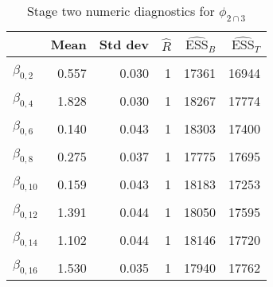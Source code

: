 \begin{table}

\caption{\label{tab:surv-stage-two-diag-phi-23}Stage two numeric diagnostics for $\phi_{2 \cap 3}$}
\centering
\begin{tabular}[t]{lrrrrr}
\toprule
  & Mean & Std dev & $\widehat{R}$ & $\widehat{\text{ESS}}_{B}$ & $\widehat{\text{ESS}}_{T}$\\
\midrule
\cellcolor{gray!6}{$\beta_{0, 1}$} & \cellcolor{gray!6}{0.139} & \cellcolor{gray!6}{0.036} & \cellcolor{gray!6}{1} & \cellcolor{gray!6}{18053} & \cellcolor{gray!6}{17573}\\
$\beta_{0, 2}$ & 0.557 & 0.030 & 1 & 17361 & 16944\\
\cellcolor{gray!6}{$\beta_{0, 3}$} & \cellcolor{gray!6}{0.198} & \cellcolor{gray!6}{0.043} & \cellcolor{gray!6}{1} & \cellcolor{gray!6}{18021} & \cellcolor{gray!6}{16843}\\
$\beta_{0, 4}$ & 1.828 & 0.030 & 1 & 18267 & 17774\\
\cellcolor{gray!6}{$\beta_{0, 5}$} & \cellcolor{gray!6}{1.297} & \cellcolor{gray!6}{0.034} & \cellcolor{gray!6}{1} & \cellcolor{gray!6}{18083} & \cellcolor{gray!6}{17891}\\
$\beta_{0, 6}$ & 0.140 & 0.043 & 1 & 18303 & 17400\\
\cellcolor{gray!6}{$\beta_{0, 7}$} & \cellcolor{gray!6}{1.856} & \cellcolor{gray!6}{0.036} & \cellcolor{gray!6}{1} & \cellcolor{gray!6}{17894} & \cellcolor{gray!6}{17607}\\
$\beta_{0, 8}$ & 0.275 & 0.037 & 1 & 17775 & 17695\\
\cellcolor{gray!6}{$\beta_{0, 9}$} & \cellcolor{gray!6}{1.573} & \cellcolor{gray!6}{0.039} & \cellcolor{gray!6}{1} & \cellcolor{gray!6}{18167} & \cellcolor{gray!6}{17897}\\
$\beta_{0, 10}$ & 0.159 & 0.043 & 1 & 18183 & 17253\\
\cellcolor{gray!6}{$\beta_{0, 11}$} & \cellcolor{gray!6}{1.399} & \cellcolor{gray!6}{0.039} & \cellcolor{gray!6}{1} & \cellcolor{gray!6}{17632} & \cellcolor{gray!6}{17151}\\
$\beta_{0, 12}$ & 1.391 & 0.044 & 1 & 18050 & 17595\\
\cellcolor{gray!6}{$\beta_{0, 13}$} & \cellcolor{gray!6}{0.134} & \cellcolor{gray!6}{0.030} & \cellcolor{gray!6}{1} & \cellcolor{gray!6}{17710} & \cellcolor{gray!6}{17402}\\
$\beta_{0, 14}$ & 1.102 & 0.044 & 1 & 18146 & 17720\\
\cellcolor{gray!6}{$\beta_{0, 15}$} & \cellcolor{gray!6}{0.081} & \cellcolor{gray!6}{0.032} & \cellcolor{gray!6}{1} & \cellcolor{gray!6}{16547} & \cellcolor{gray!6}{17404}\\
$\beta_{0, 16}$ & 1.530 & 0.035 & 1 & 17940 & 17762\\
\bottomrule
\end{tabular}
\end{table}